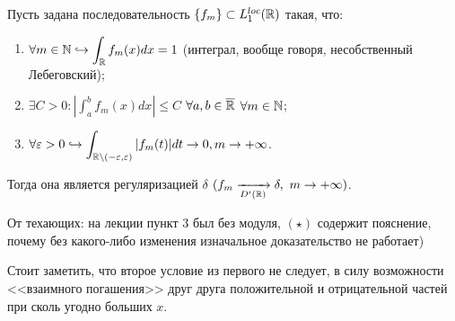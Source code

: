 \begin{theorem}
    Пусть задана последовательность $\{f_m\} \subset L_1^{loc}(\mathbb{R})$ такая, что:
    \begin{enumerate}
        \item $\displaystyle \forall m \in \mathbb{N} \hookrightarrow \int_{\mathbb{R}} f_m(x) dx = 1$ (интеграл, вообще говоря, несобственный Лебеговский);

        \item $\displaystyle \exists C > 0 : \left|\int_a^b f_m(x)dx\right| \leq C$ $\forall a, b \in \overline{\mathbb{R}}$ $\forall m \in \mathbb{N}$;

        \item $\displaystyle \forall \varepsilon > 0 \hookrightarrow \int_{\mathbb{R} \setminus (-\varepsilon, \varepsilon)} |f_m(t)|dt \rightarrow 0, m \rightarrow +\infty$.
    \end{enumerate}
    Тогда она является регуляризацией $\delta$ $(f_m \xrightarrow[D'(\mathbb{R})]{} \delta, \ m \rightarrow +\infty)$.
\end{theorem}

\begin{remark}
        От техающих: на лекции пункт $3$ был без модуля, $(\star)$ содержит пояснение, почему без какого-либо изменения изначальное доказательство не работает)
    \end{remark}
    \begin{note}
        Стоит заметить, что второе условие из первого не следует, в силу возможности <<взаимного погашения>> друг друга положительной и отрицательной частей при сколь угодно больших $x$.
    \end{note}

